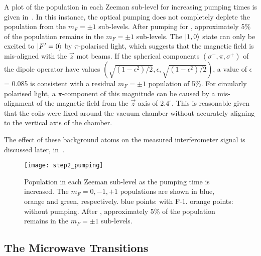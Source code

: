 \par\noindent
A plot of the population in each Zeeman sub-level for increasing
pumping times is given in~. In this
instance, the optical pumping does not completely deplete the
population from the \(m_F = \pm 1\) sub-levels. After pumping for
, approximately 5\% of the population
remains in the \(m_F = \pm 1\) sub-levels. The \(\ket{1,0}\) state can
only be excited to \(\ket{F'=0}\) by \(\pi\)-polarised light, which
suggests that the magnetic field is mis-aligned with the \(\vec{z}\)
\ac{mot} beams. If the spherical components $(\sigma^-,\pi,\sigma^+)$
of the dipole operator have values
$(\sqrt{(1-\epsilon^2)/2},\epsilon,
\sqrt{(1-\epsilon^2)/2})$, a value of $\epsilon$ = 0.085 is consistent
with a residual $m_F = \pm 1$ population of 5\%. For circularly
polarised light, a $\pi$-component of this magnitude can be caused by
a mis-alignment of the magnetic field from the $\vec{z}$ axis of
$2.4^\circ$. This is reasonable given that the coils were fixed around
the vacuum chamber without accurately aligning to
the vertical axis of the chamber.

The effect of these background atoms on the measured
interferometer signal is discussed later,
in~.
\begin{figure}[!htbp]
    \centering
    \texttt{[image: step2\_pumping]}
    \caption[\(\ket{1,m_F}\) populations for increasing 
    pumping time.]{Population in each Zeeman sub-level as the
     pumping time is increased. The \(m_F = 0, -1, +1\)
  populations are shown in blue, orange and green, respectively. blue
points: with F-1. orange points: without pumping. After , approximately 5\% of the population remains in the \(m_F = \pm 1\) sub-levels.}
    \label{fig:step2_pumping}
\end{figure}
\subsection{The Microwave Transitions}\label{subsec:microwaves}
